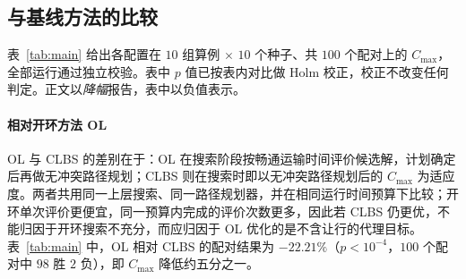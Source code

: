 \documentclass[manuscript,screen,review]{acmart}
\newcommand{\NCases}{10}
\newcommand{\NSeeds}{10}
\newcommand{\NPairs}{100}
\newcommand{\GainEndToEnd}{22.21\%}      %
\newcommand{\PEndToEnd}{<10^{-4}}
\newcommand{\WinEndToEnd}{98}
\newcommand{\LoseEndToEnd}{2}
\begin{document}
\subsection{与基线方法的比较}
\label{sec:main}

表~\ref{tab:main} 给出各配置在 $\NCases$ 组算例 $\times$ $\NSeeds$ 个种子、共 $\NPairs$ 个配对上的 $C_{\max}$，全部运行通过独立校验。表中 $p$ 值已按表内对比做 Holm 校正，校正不改变任何判定。正文以\emph{降幅}报告，表中以负值表示。

\begin{table}[t]
\caption{各配置在相同运行时间预算下的完工时间，以及配对比较。上半为本文方法与三种基线方法的比较，下半为只改变一个维度的消融。
负值表示完工时间下降，即更好。$n=\NPairs$ 个按 $(\text{算例},\text{种子})$ 配对的比较，
双侧 Wilcoxon 符号秩检验；$p$ 值已按本表六个对比做 Holm 校正
($^{*}p<0.05$、$^{**}p<0.01$、$^{***}p<0.001$)。HL 列为逐对相对增益的 Hodges--Lehmann
伪中位数及其 $95\%$ 分布无关置信区间（见第~\ref{sec:protocol}~节）。
表头加粗者为本文配置；数值不加粗，因 CLBS 并非每组都最好。}
\label{tab:main}
\small

\end{table}

\paragraph{相对开环方法 OL}
OL 与 CLBS 的差别在于：OL 在搜索阶段按畅通运输时间评价候选解，计划确定后再做无冲突路径规划；CLBS 则在搜索时即以无冲突路径规划后的 $C_{\max}$ 为适应度。两者共用同一上层搜索、同一路径规划器，并在相同运行时间预算下比较；开环单次评价更便宜，同一预算内完成的评价次数更多，因此若 CLBS 仍更优，不能归因于开环搜索不充分，而应归因于 OL 优化的是不含让行的代理目标。
表~\ref{tab:main} 中，OL 相对 CLBS 的配对结果为 $-\GainEndToEnd$（$p\PEndToEnd$，$\NPairs$ 个配对中 $\WinEndToEnd$ 胜 $\LoseEndToEnd$ 负），即 $C_{\max}$ 降低约五分之一。
\end{document}
